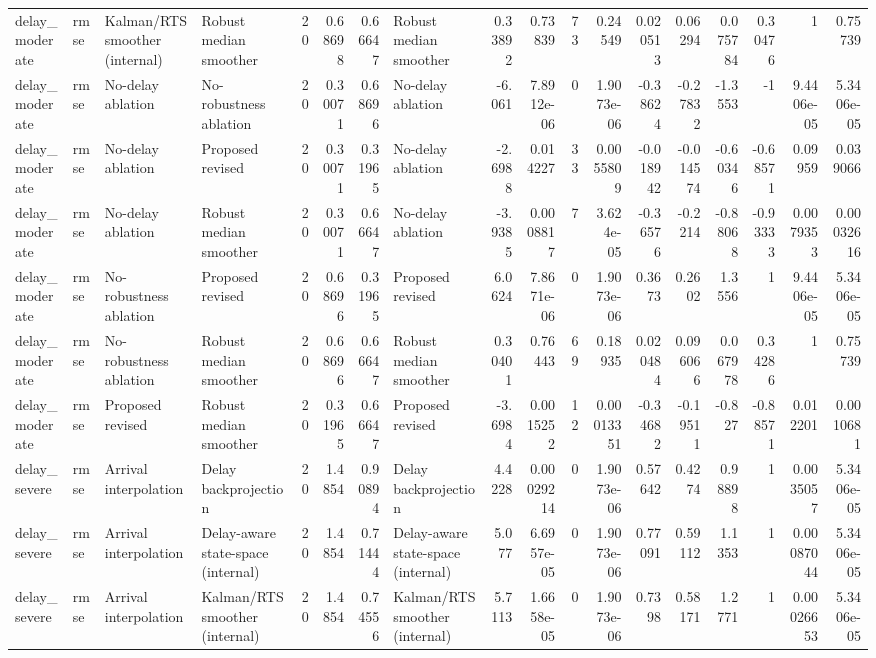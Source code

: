 \begin{table}[!htbp]
{\begin{tabular}{llllrrrlrrrrrrrrrr}
delay_moderate & rmse & Kalman/RTS smoother (internal) & Robust median smoother & 20 & 0.68698 & 0.66647 & Robust median smoother & 0.33892 & 0.73839 & 73 & 0.24549 & 0.020513 & 0.06294 & 0.075784 & 0.30476 & 1 & 0.75739 \\
delay_moderate & rmse & No-delay ablation & No-robustness ablation & 20 & 0.30071 & 0.68696 & No-delay ablation & -6.061 & 7.8912e-06 & 0 & 1.9073e-06 & -0.38624 & -0.27832 & -1.3553 & -1 & 9.4406e-05 & 5.3406e-05 \\
delay_moderate & rmse & No-delay ablation & Proposed revised & 20 & 0.30071 & 0.31965 & No-delay ablation & -2.6988 & 0.014227 & 33 & 0.0055809 & -0.018942 & -0.014574 & -0.60346 & -0.68571 & 0.09959 & 0.039066 \\
delay_moderate & rmse & No-delay ablation & Robust median smoother & 20 & 0.30071 & 0.66647 & No-delay ablation & -3.9385 & 0.0008817 & 7 & 3.624e-05 & -0.36576 & -0.2214 & -0.88068 & -0.93333 & 0.0079353 & 0.00032616 \\
delay_moderate & rmse & No-robustness ablation & Proposed revised & 20 & 0.68696 & 0.31965 & Proposed revised & 6.0624 & 7.8671e-06 & 0 & 1.9073e-06 & 0.3673 & 0.2602 & 1.3556 & 1 & 9.4406e-05 & 5.3406e-05 \\
delay_moderate & rmse & No-robustness ablation & Robust median smoother & 20 & 0.68696 & 0.66647 & Robust median smoother & 0.30401 & 0.76443 & 69 & 0.18935 & 0.020484 & 0.096066 & 0.067978 & 0.34286 & 1 & 0.75739 \\
delay_moderate & rmse & Proposed revised & Robust median smoother & 20 & 0.31965 & 0.66647 & Proposed revised & -3.6984 & 0.0015252 & 12 & 0.00013351 & -0.34682 & -0.19511 & -0.827 & -0.88571 & 0.012201 & 0.0010681 \\
delay_severe & rmse & Arrival interpolation & Delay backprojection & 20 & 1.4854 & 0.90894 & Delay backprojection & 4.4228 & 0.00029214 & 0 & 1.9073e-06 & 0.57642 & 0.4274 & 0.98898 & 1 & 0.0035057 & 5.3406e-05 \\
delay_severe & rmse & Arrival interpolation & Delay-aware state-space (internal) & 20 & 1.4854 & 0.71444 & Delay-aware state-space (internal) & 5.077 & 6.6957e-05 & 0 & 1.9073e-06 & 0.77091 & 0.59112 & 1.1353 & 1 & 0.00087044 & 5.3406e-05 \\
delay_severe & rmse & Arrival interpolation & Kalman/RTS smoother (internal) & 20 & 1.4854 & 0.74556 & Kalman/RTS smoother (internal) & 5.7113 & 1.6658e-05 & 0 & 1.9073e-06 & 0.7398 & 0.58171 & 1.2771 & 1 & 0.00026653 & 5.3406e-05 \\

\end{tabular}}
\end{table}
